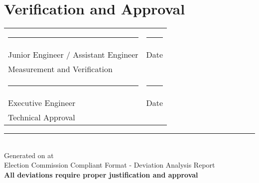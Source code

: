 \documentclass[12pt,a4paper]{article}
\begin{document}
\vspace{2cm}
\section*{Verification and Approval}

\begin{tabular}{p{6cm}p{6cm}}
\rule{5cm}{0.5pt} & \rule{5cm}{0.5pt} \\
Junior Engineer / Assistant Engineer & Date \\
Measurement and Verification & \\[1cm]

\rule{5cm}{0.5pt} & \rule{5cm}{0.5pt} \\
Executive Engineer & Date \\
Technical Approval & \\[1cm]

\end{tabular}

\vspace{2cm}
\begin{center}
\rule{\textwidth}{1pt}\\
\small
Generated on  at \\
Election Commission Compliant Format - Deviation Analysis Report\\
\textbf{All deviations require proper justification and approval}
\end{center}
\end{document}

